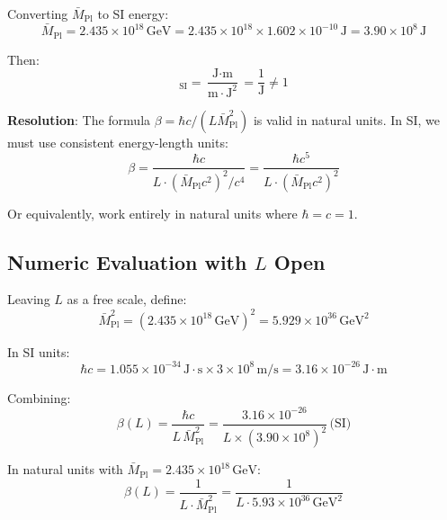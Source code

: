 \documentclass[11pt,a4paper]{article}
\newcommand{\Mpl}{\bar{M}_{\mathrm{Pl}}}
\newcommand{\GeV}{\,\mathrm{GeV}}
\theoremstyle{definition}
\theoremstyle{plain}
\theoremstyle{remark}
\begin{document}
Converting $\Mpl$ to SI energy:
\begin{equation}
\Mpl = 2.435 \times 10^{18}\GeV = 2.435 \times 10^{18} \times 1.602 \times 10^{-10}\,\text{J}
= 3.90 \times 10^{8}\,\text{J}
\label{eq:Mpl-SI-joules}
\end{equation}

Then:
\begin{equation}
[\beta]_{\text{SI}} = \frac{\text{J} \cdot \text{m}}{\text{m} \cdot \text{J}^2} = \frac{1}{\text{J}} \neq 1
\label{eq:beta-SI-naive}
\end{equation}

\textbf{Resolution}: The formula $\beta = \hbar c / (L\Mpl^2)$ is valid in natural units.
In SI, we must use consistent energy-length units:
\begin{equation}
\beta = \frac{\hbar c}{L \cdot (\Mpl c^2)^2 / c^4} = \frac{\hbar c^5}{L \cdot (\Mpl c^2)^2}
\label{eq:beta-SI-correct}
\end{equation}

Or equivalently, work entirely in natural units where $\hbar = c = 1$.

\subsection{Numeric Evaluation with $L$ Open}

Leaving $L$ as a free scale, define:
\begin{equation}
\Mpl^2 = (2.435 \times 10^{18}\GeV)^2 = 5.929 \times 10^{36}\GeV^2
\label{eq:Mpl-squared}
\end{equation}

In SI units:
\begin{equation}
\hbar c = 1.055 \times 10^{-34}\,\text{J}\cdot\text{s} \times 3 \times 10^8\,\text{m/s}
= 3.16 \times 10^{-26}\,\text{J}\cdot\text{m}
\label{eq:hbar-c-SI-value}
\end{equation}

Combining:
\begin{equation}
\beta(L) = \frac{\hbar c}{L \, \Mpl^2} = \frac{3.16 \times 10^{-26}}{L \times (3.90 \times 10^8)^2}\,\text{(SI)}
\label{eq:beta-numeric-L-open}
\end{equation}

In natural units with $\Mpl = 2.435 \times 10^{18}\GeV$:
\begin{equation}
\beta(L) = \frac{1}{L \cdot \Mpl^2} = \frac{1}{L \cdot 5.93 \times 10^{36}\GeV^2}
\label{eq:beta-numeric-natural}
\end{equation}
\end{document}

